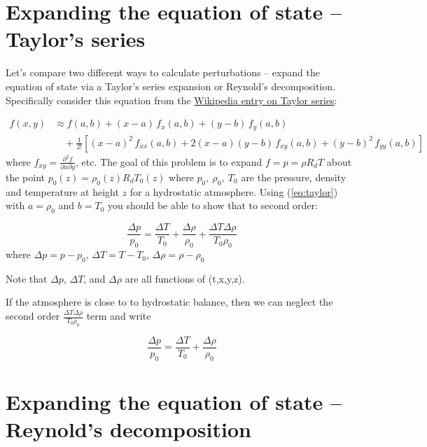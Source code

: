 \documentclass[12pt]{article}
\begin{document}
\newcommand{\vect}[1]{\boldsymbol{\vec{#1}}}
\pagestyle{first}

\section{Expanding the equation of state -- Taylor's series}


Let's compare two different ways to calculate perturbations --  expand the equation of state via a Taylor's
series expansion or Reynold's decomposition.  Specifically consider this equation from the
\href{http://en.wikipedia.org/wiki/Taylor_series}{Wikipedia entry on Taylor series}:

\begin{align}
  \label{eq:taylor}
f(x,y) & \approx f(a,b) +(x-a)\, f_x(a,b) +(y-b)\, f_y(a,b)\nonumber \\
& {}\quad + \frac{1}{2!}\left[ (x-a)^2\,f_{xx}(a,b) + 2(x-a)(y-b)\,f_{xy}(a,b) +(y-b)^2\, f_{yy}(a,b) \right]
\end{align}
where $f_{xy} = \frac{ \partial^2 f}{\partial x \partial y }$, etc.  The goal
of this problem is to expand $f=p=\rho R_d T$ about the point 
$p_0(z) = \rho_0(z) R_d T_0(z)$ where $p_0,\ \rho_0,\ T_0$ are the pressure,
density and temperature at height $z$ for a hydrostatic atmosphere.  Using (\ref{eq:taylor}) with $a=\rho_0$ and $b=T_0$ you should be able to show that
to second order:

\begin{equation}
  \label{eq:delta}
\frac{\Delta p }{p_0}    = \frac{ \Delta T}{T_0} + \frac{ \Delta \rho}{\rho_0} 
 + \frac{ \Delta T \Delta \rho}{T_0 \rho_0} 
\end{equation}
where $\Delta p = p - p_0$, $\Delta T = T - T_0$, $\Delta \rho = \rho - \rho_0$

Note that $\Delta p$, $\Delta T$, and $\Delta \rho$ are all functions of
(t,x,y,z).

If the atmosphere is close to to hydrostatic balance, then we can neglect the second order 
$\frac{ \Delta T \Delta \rho}{T_0 \rho_0} $ term and write

\begin{equation}
  \label{eq:delta}
\frac{\Delta p }{p_0}    = \frac{ \Delta T}{T_0} + \frac{ \Delta \rho}{\rho_0} 
\end{equation}


\section{Expanding the equation of state -- Reynold's decomposition}
\end{document}
